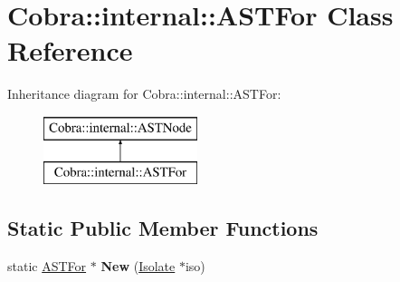 \hypertarget{class_cobra_1_1internal_1_1_a_s_t_for}{\section{Cobra\+:\+:internal\+:\+:A\+S\+T\+For Class Reference}
\label{class_cobra_1_1internal_1_1_a_s_t_for}
}
Inheritance diagram for Cobra\+:\+:internal\+:\+:A\+S\+T\+For\+:\begin{figure}[H]
\begin{center}
\leavevmode
\includegraphics[height=2.000000cm]{class_cobra_1_1internal_1_1_a_s_t_for}
\end{center}
\end{figure}
\subsection*{Static Public Member Functions}
\begin{DoxyCompactItemize}
\item 
\hypertarget{class_cobra_1_1internal_1_1_a_s_t_for_aab3c804344bc09c81fdcca833a8b51a2}{static \hyperlink{class_cobra_1_1internal_1_1_a_s_t_for}{A\+S\+T\+For} $\ast$ {\bfseries New} (\hyperlink{class_cobra_1_1internal_1_1_isolate}{Isolate} $\ast$iso)}\label{class_cobra_1_1internal_1_1_a_s_t_for_aab3c804344bc09c81fdcca833a8b51a2}

\end{DoxyCompactItemize}
